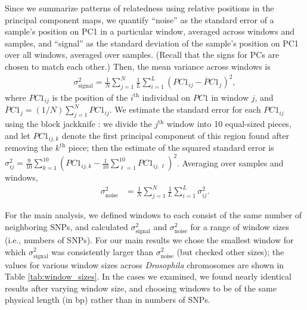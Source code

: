 \documentclass[11pt, oneside]{article}   	%
\newcommand{\pcone}{PC1}
\begin{document}
Since we summarize patterns of relatedness using relative positions in the principal component maps,
we quantify ``noise'' as the standard error of a sample's position on PC1 in a particular window,
averaged across windows and samples,
and ``signal'' as the standard deviation of the sample's position on PC1 over all windows,
averaged over samples.
(Recall that the signs for PCs are chosen to match each other.)
Then, the mean variance across windows is
\begin{align*}
    \sigma_\text{signal}^2
    = 
    \frac{1}{N} \sum_{j=1}^{N}
        \frac{1}{L}\sum_{i=1}^{L}\left ( \pcone_{ij} -\overline\pcone_{j} \right )^{2} ,
\end{align*}
where $\pcone_{ij}$ is the position of the $i^\text{th}$ individual on $\pcone$ in window $j$,
and $\overline\pcone_j = (1/N) \sum_{j=1}^N \pcone_{ij}$.
We estimate the standard error for each $\pcone_{ij}$ using the block jackknife \citep{efron1982jackknife,busing1999deletem}:
we divide the $j^\text{th}$ window into 10 equal-sized pieces,
and let $\pcone_{ij,k}$ denote the first principal component of this region found after removing the $k^\text{th}$ piece;
then the estimate of the squared standard error is
$\sigma^2_{ij} = \frac{9}{10} \sum_{k=1}^{10} ( \pcone_{ij,k} - \frac{1}{10} \sum_{\ell=1}^{10} \pcone_{ij,\ell} )^2$.
Averaging over samples and windows,
\begin{align*}
    \sigma^2_\text{noise}
    &=
    \frac{1}{N} \sum_{j=1}^{N} \frac{1}{L}\sum_{i=1}^{L} \sigma^2_{ij} .
\end{align*}

For the main analysis, we defined windows to each consist of the same number of neighboring SNPs,
and calculated $\sigma^2_\text{signal}$ and $\sigma^2_\text{noise}$
for a range of window sizes (i.e., numbers of SNPs).
For our main results we
chose the smallest window for which $\sigma^2_\text{signal}$ was consistently larger than $\sigma^2_\text{noise}$ (but checked other sizes);
the values for various window sizes across \textit{Drosophila} chromosomes are shown in Table \ref{tab:window_sizes}.
In the cases we examined, we found nearly identical results after varying window size,
and choosing windows to be of the same physical length (in bp) rather than in numbers of SNPs.
\end{document}
